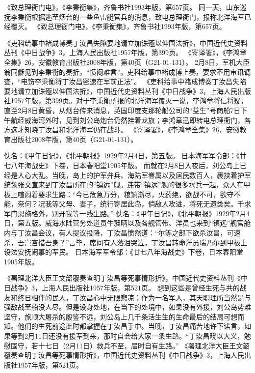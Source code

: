 \documentclass[12pt,UTF8]{ctexbook}
\begin{document}
《致总理衙门电》，《李秉衡集》，齐鲁书社1993年版，第657页。
同一天，山东巡抚李秉衡根据逃至烟台的一些鱼雷艇官兵的消息，致电总理衙门，报称北洋海军已经覆灭。 《致总理衙门电》，《李秉衡集》，齐鲁书社1993年版，第657页。

《吏科给事中褚成博奏丁汝昌失陷要地请立加诛殛以伸国法折》，中国近代史资料丛刊《中日战争》3，上海人民出版社1957年版，第399页。
《寄译署》，《李鸿章全集》26，安徽教育出版社2008年版，第40页（G21-01-131）。
2月8日，军机大臣翁同龢见到李秉衡的奏折，“愤闷难言”。吏科给事中褚成博上奏，要求不用审讯调查，“电饬李秉衡将丁汝昌密速在军前正法”。 《吏科给事中褚成博奏丁汝昌失陷要地请立加诛殛以伸国法折》，中国近代史资料丛刊《中日战争》3，上海人民出版社1957年版，第399页。对于李秉衡所报的北洋海军覆灭一说，李鸿章将信将疑，直至2月8日黄昏，从烟台传来消息，英国印度支那轮船公司的“益生”号商船7日下午航经威海湾外时，见到刘公岛炮台仍然挂着龙旗；李鸿章迅即转电总理衙门，各方这才知晓丁汝昌和北洋海军仍在战斗。 《寄译署》，《李鸿章全集》26，安徽教育出版社2008年版，第40页（G21-01-131）。

佚名：《甲午日记》，《北平朝报》1929年2月4日，第五版。
日本海军军令部：《廿七八年海战史》下卷，日本春阳堂1905年版。
而就在2月8日入夜后，刘公岛上已经是人心大乱。当晚，岛上的护军弁兵、海陆军眷属以及居民数百人，裹挟着护军统领张文宣来到丁汝昌所在的“镇远”舰。连带“镇远”舰的很多水兵一起，众人在甲板上喧闹着要求生路：“今已危急万分，粮饷渐尽，火药绝，欲战不可，欲守不能，奈何？况我等父母、妻子，统行寄居此岛，倘敌人攻进，将死无遗类矣。千求军门恩施格外，别开我等一线生路。” 佚名：《甲午日记》，《北平朝报》1929年2月4日，第五版。威海水陆营务处道员牛昶昞以及各舰管带、洋员也来到“镇远”舰官舱内与丁汝昌会议，有人提议投降，丁汝昌愤然道：“尔等之部下欲杀汝昌，可速杀，吾岂吝惜吾身？”言毕，席间有人落泪哭泣，丁汝昌转命洋员瑞乃尔到甲板上设法安抚闹事的军民。 日本海军军令部：《廿七八年海战史》下卷，日本春阳堂1905年版。

《署理北洋大臣王文韶覆奏查明丁汝昌等死事情形折》，中国近代史资料丛刊《中日战争》3，上海人民出版社1957年版，第521页。
想到这些是曾经生死与共的战友和终日相伴的民人，丁汝昌心中无限悲凉；作为一名军人，其天职理所当然是与强敌战至船没人尽。但是设身处地，在当下的处境中，如果没有外援，刘公岛势难坚守，旅顺大屠杀的殷鉴不远，刘公岛上几千条活生生的生命最后的结局可想而知。他们的生死前途此时都掌握在丁汝昌手中。当晚，丁汝昌痛苦地许下诺言，如果等到2月11日还没有援军到来，那时自会给大家一条生路。“丁汝昌晓以大义，勉慰固守，若十七日（2月11日）救兵不至，届时自有生路。” 《署理北洋大臣王文韶覆奏查明丁汝昌等死事情形折》，中国近代史资料丛刊《中日战争》3，上海人民出版社1957年版，第521页。
\end{document}
